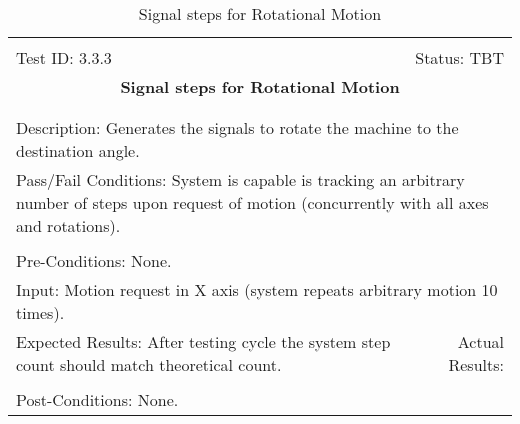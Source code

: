 \documentclass[titlepage]{article}
\begin{document}
\begin{center}%
\begin{table}[h!]
\begin{tabular}{|l r|}\hline&\\[-2mm]
	Test ID: 3.3.3	&Status: TBT\\[-3mm]
	\multicolumn{2}{|c|}{\textbf{\large{Signal steps for Rotational Motion}}}\\&\\\hline&\\[-3mm]
	\multicolumn{2}{|p{\textwidth}|}{Description: Generates the signals to rotate the machine to the destination angle.}\\\hline
	\multicolumn{2}{|p{\textwidth}|}{Pass/Fail Conditions: System is capable is tracking an arbitrary number of steps upon request of motion (concurrently with all axes and rotations).}\\[1mm]\hline&\\[-3mm]
	\multicolumn{2}{|p{\textwidth}|}{Pre-Conditions: None.}\\[4mm]
	\multicolumn{2}{|p{\textwidth}|}{Input: Motion request in X axis (system repeats arbitrary motion 10 times).}\\[2mm]\hline
	\multicolumn{1}{|p{0.49\textwidth}}{Expected Results: After testing cycle the system step count should match theoretical count.}	&\multicolumn{1}{|p{0.45\textwidth}|}{Actual Results: }\\\hline&\\[-3mm]
	\multicolumn{2}{|p{\textwidth}|}{Post-Conditions: None.}\\\hline
\end{tabular}
\caption{Signal steps for Rotational Motion}
\end{table}
\end{center}
\end{document}
